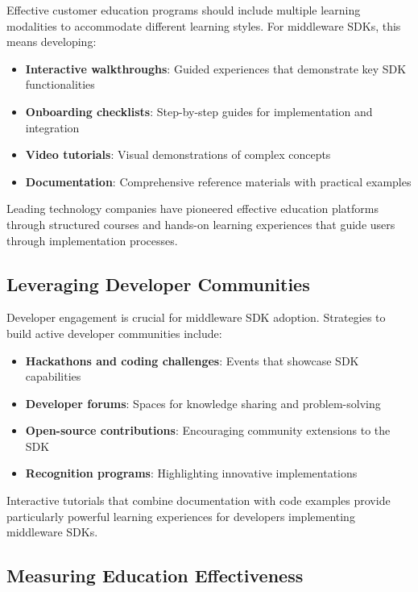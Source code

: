 \documentclass[11pt,a4paper]{article}
\begin{document}
Effective customer education programs should include multiple learning modalities to accommodate different learning styles. For middleware SDKs, this means developing:

\begin{itemize}
    \item \textbf{Interactive walkthroughs}: Guided experiences that demonstrate key SDK functionalities
    \item \textbf{Onboarding checklists}: Step-by-step guides for implementation and integration
    \item \textbf{Video tutorials}: Visual demonstrations of complex concepts
    \item \textbf{Documentation}: Comprehensive reference materials with practical examples
\end{itemize}

Leading technology companies have pioneered effective education platforms through structured courses and hands-on learning experiences that guide users through implementation processes.

\subsection{Leveraging Developer Communities}

Developer engagement is crucial for middleware SDK adoption. Strategies to build active developer communities include:

\begin{itemize}
    \item \textbf{Hackathons and coding challenges}: Events that showcase SDK capabilities
    \item \textbf{Developer forums}: Spaces for knowledge sharing and problem-solving
    \item \textbf{Open-source contributions}: Encouraging community extensions to the SDK
    \item \textbf{Recognition programs}: Highlighting innovative implementations
\end{itemize}

Interactive tutorials that combine documentation with code examples provide particularly powerful learning experiences for developers implementing middleware SDKs.

\subsection{Measuring Education Effectiveness}
\end{document}
